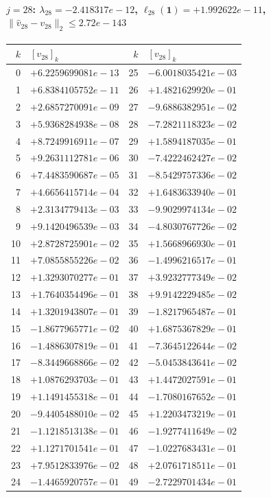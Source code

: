 \documentclass[11pt]{article}
\begin{document}
\paragraph{$j = 28$: $\lambda_{28} = -2.418317e-12$, \quad $\ell_{28}(\mathbf{1}) = +1.992622e-11$, \quad $\|\hat{v}_{28} - v_{28}\|_2 \leq 2.72e-143$}
\begin{center}
{\footnotesize
\begin{tabular}{r@{\;\;}l@{\quad}r@{\;\;}l}
\toprule
$k$ & $[v_{28}]_k$ & $k$ & $[v_{28}]_k$ \\
\midrule
0 & $+6.2259699081e-13$ & 25 & $-6.0018035421e-03$ \\
1 & $+6.8384105752e-11$ & 26 & $+1.4821629920e-01$ \\
2 & $+2.6857270091e-09$ & 27 & $-9.6886382951e-02$ \\
3 & $+5.9368284938e-08$ & 28 & $-7.2821118323e-02$ \\
4 & $+8.7249916911e-07$ & 29 & $+1.5894187035e-01$ \\
5 & $+9.2631112781e-06$ & 30 & $-7.4222462427e-02$ \\
6 & $+7.4483590687e-05$ & 31 & $-8.5429757336e-02$ \\
7 & $+4.6656415714e-04$ & 32 & $+1.6483633940e-01$ \\
8 & $+2.3134779413e-03$ & 33 & $-9.9029974134e-02$ \\
9 & $+9.1420496539e-03$ & 34 & $-4.8030767726e-02$ \\
10 & $+2.8728725901e-02$ & 35 & $+1.5668966930e-01$ \\
11 & $+7.0855855226e-02$ & 36 & $-1.4996216517e-01$ \\
12 & $+1.3293070277e-01$ & 37 & $+3.9232777349e-02$ \\
13 & $+1.7640354496e-01$ & 38 & $+9.9142229485e-02$ \\
14 & $+1.3201943807e-01$ & 39 & $-1.8217965487e-01$ \\
15 & $-1.8677965771e-02$ & 40 & $+1.6875367829e-01$ \\
16 & $-1.4886307819e-01$ & 41 & $-7.3645122644e-02$ \\
17 & $-8.3449668866e-02$ & 42 & $-5.0453843641e-02$ \\
18 & $+1.0876293703e-01$ & 43 & $+1.4472027591e-01$ \\
19 & $+1.1491455318e-01$ & 44 & $-1.7080167652e-01$ \\
20 & $-9.4405488010e-02$ & 45 & $+1.2203473219e-01$ \\
21 & $-1.1218513138e-01$ & 46 & $-1.9277411649e-02$ \\
22 & $+1.1271701541e-01$ & 47 & $-1.0227683431e-01$ \\
23 & $+7.9512833976e-02$ & 48 & $+2.0761718511e-01$ \\
24 & $-1.4465920757e-01$ & 49 & $-2.7229701434e-01$ \\
\bottomrule
\end{tabular}
}
\end{center}
\end{document}
